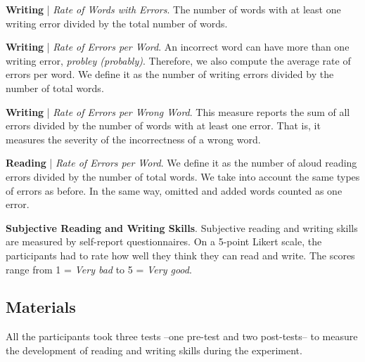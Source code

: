\documentclass[letterpaper]{sig-alternate-2013}
\begin{document}
\textbf{Writing} | {\it Rate of Words with Errors}. The number of words with at least one writing error divided by the total number of words.

\textbf{Writing} | {\it Rate of Errors per Word}. An incorrect word can have more than one writing error, {\it*probley (probably)}. Therefore, we also compute the average rate of errors per word. We define it as the number of writing errors divided by the number of total words.

\textbf{Writing} | {\it Rate of Errors per Wrong Word}. This measure reports the sum of all errors divided by the number of words with at least one error. That is, it measures the severity of the incorrectness of a wrong word.

\textbf{Reading} | {\it Rate of Errors per Word}. We define it as the number of aloud reading errors divided by the number of total words. We take into account the same types of errors as before. In the same way, omitted and added words counted as one error.

\textbf{Subjective Reading and Writing Skills}. Subjective reading and writing skills are measured by self-report questionnaires. On a 5-point Likert scale, the participants had to rate how well they think they can read and write. The scores range from 1 = \emph{Very bad} to 5 = \emph{Very good}. 



\subsection{Materials}
\vspace{0.1cm}




All the participants took three tests --one pre-test and two post-tests-- to measure the development of reading and writing skills during the experiment. 
\end{document}
